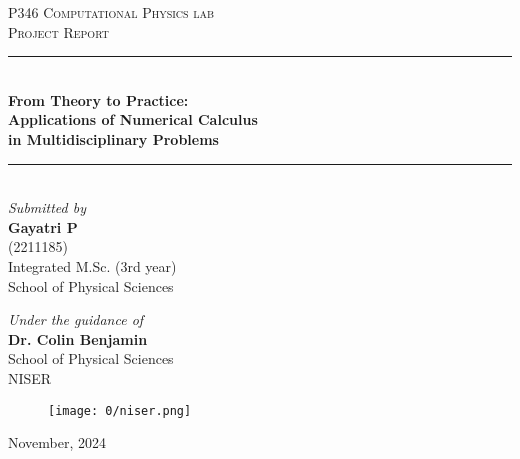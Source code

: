 \begin{titlepage} 
	\newcommand{\HRule}{\rule{\linewidth}{0.5mm}} 
	
	\center 
	\vfill
	\vfill
	\vfill
	
	\textsc{\large P346 Computational Physics lab\\Project Report}\\[0.5cm]
	
	\HRule\\[0.4cm]
	



         {\huge\bfseries From Theory to Practice:} {\huge\bfseries\\[0.3cm] Applications of Numerical Calculus \\[0.3cm] in Multidisciplinary Problems }\\[0.4cm] 

	
	\HRule\\[1.5cm]
	\vspace{1.2cm}
	{\Large\textit{Submitted by}}\\
	   \Large{\textbf{Gayatri P}\\(2211185)\\Integrated M.Sc. (3rd year)\\School of Physical Sciences}
      
    \vspace{1.4cm}
    {\Large\textit{Under the guidance of}}\\
    \Large{\textbf{Dr. Colin Benjamin}\\School of Physical Sciences\\NISER}\\
    \vspace{0.9cm}
    \vfill
    
\begin{figure}[H]
    \centering
    \texttt{[image: 0/niser.png]}
\end{figure}

	\vfill

	{\large November, 2024} 
	
	\vfill
	\vfill
	\vfill
	\vfill
	
 
\end{titlepage}